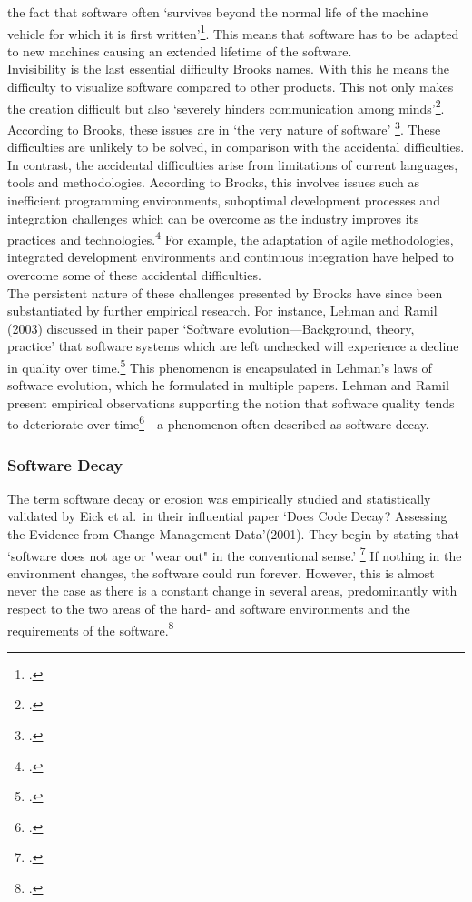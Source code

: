 the fact that software often `survives beyond the normal life of the machine vehicle for which it is first written'\footcite[4]{brooksNoSilverBullet1987}. This means that software has to be adapted to new machines causing an extended lifetime of the software.\\
Invisibility is the last essential difficulty Brooks names. With this he means the difficulty to visualize software compared to other products. This not only makes the creation difficult but also `severely hinders communication among minds'\footcite[4]{brooksNoSilverBullet1987}.
According to Brooks, these issues are in `the very nature of software' \footcite[2]{brooksNoSilverBullet1987}. These difficulties are unlikely to be solved, in comparison with the accidental difficulties.\\

In contrast, the accidental difficulties arise from limitations of current languages, tools and methodologies. According to Brooks, this involves issues such as inefficient programming environments, suboptimal development processes and integration challenges which can be overcome as the industry improves its practices and technologies.\footcite[5-6]{brooksNoSilverBullet1987}
For example, the adaptation of agile methodologies, integrated development environments and continuous integration have helped to overcome some of these accidental difficulties.\\

The persistent nature of these challenges presented by Brooks have since been substantiated by further empirical research. For instance, Lehman and Ramil (2003) discussed in their paper `Software evolution—Background, theory, practice' that software systems which are left unchecked will experience a decline in quality over time.\footcite[34]{lehmanSoftwareEvolutionBackground2003}
This phenomenon is encapsulated in Lehman's laws of software evolution, which he formulated in multiple papers.  Lehman and Ramil present empirical observations supporting the notion that software quality tends to deteriorate over time\footcite[42]{lehmanSoftwareEvolutionBackground2003} - a phenomenon often described as
software decay.

\subsubsection{Software Decay}
The term software decay or erosion was empirically studied and statistically validated by Eick et al.\ in their influential paper `Does Code Decay? Assessing the Evidence from Change Management Data'(2001). They begin by stating that `software does not age or "wear out" in the conventional sense.' \footcite[1]{eickDoesCodeDecay2001}
If nothing in the environment changes, the software could run forever. However, this is almost never the case as there is a constant change in several areas, predominantly with respect to the two areas of the hard- and software environments and the requirements of the software.\footcite[1]{eickDoesCodeDecay2001}\\

